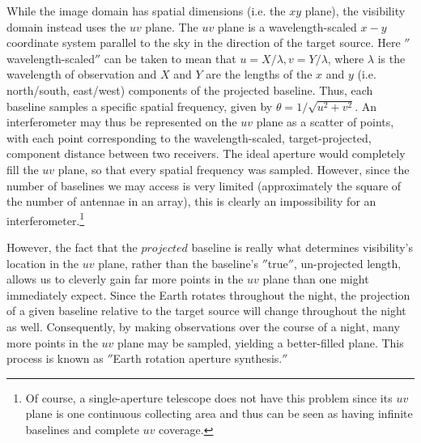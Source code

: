 While the image domain has spatial dimensions (i.e. the $xy$ plane), the visibility domain instead uses the $uv$ plane. The $uv$ plane is a wavelength-scaled $x-y$ coordinate system parallel to the sky in the direction of the target source. Here $''$wavelength-scaled$''$ can be taken to mean that $u = X/\lambda, v = Y/\lambda$, where $\lambda$ is the wavelength of observation and $X$ and $Y$ are the lengths of the $x$ and $y$ (i.e. north/south, east/west) components of the projected baseline. Thus, each baseline samples a specific spatial frequency, given by $\theta = 1/\sqrt{u^2 + v^2}$. An interferometer may thus be represented on the $uv$ plane as a scatter of points, with each point corresponding to the wavelength-scaled, target-projected, component distance between two receivers. The ideal aperture would completely fill the $uv$ plane, so that every spatial frequency was sampled. However, since the number of baselines we may access is very limited (approximately the square of the number of antennae in an array), this is clearly an impossibility for an interferometer.\footnote{Of course, a single-aperture telescope does not have this problem since its $uv$ plane is one continuous collecting area and thus can be seen as having infinite baselines and complete $uv$ coverage.}


However, the fact that the $projected$ baseline is really what determines visibility's location in the $uv$ plane, rather than the baseline's $''$true$''$, un-projected length, allows us to cleverly gain far more points in the $uv$ plane than one might immediately expect. Since the Earth rotates throughout the night, the projection of a given baseline relative to the target source will change throughout the night as well. Consequently, by making observations over the course of a night, many more points in the $uv$ plane may be sampled, yielding a better-filled plane. This process is known as $''$Earth rotation aperture synthesis.$''$

